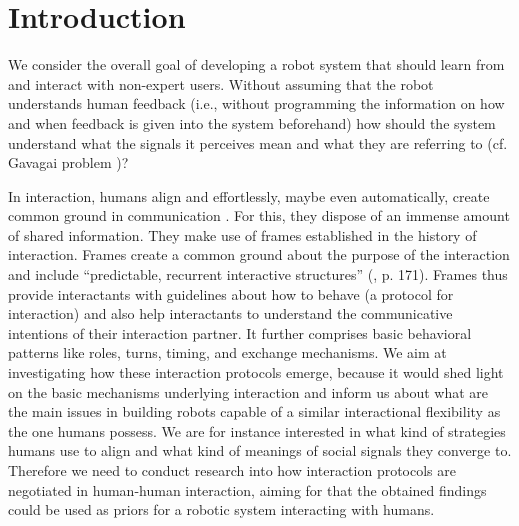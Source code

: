 \section{Introduction}


We consider the overall goal of developing a robot system that should learn from and interact with non-expert users. Without assuming that the robot understands human feedback (i.e., without programming the information on how and when feedback is given into the system beforehand) how should the system understand what the signals it perceives mean and what they are referring to (cf. Gavagai problem \cite{quine1964word})?

In interaction, humans align and effortlessly, maybe even automatically, create common ground in communication \cite{clark1991grounding,pickering2004toward}. For this, they dispose of an immense amount of shared information. They make use of frames established in the history of interaction. Frames create a common ground about the purpose of the interaction \cite{tomasello2009cultural,rohlfing2013learning} and include ``predictable, recurrent interactive structures'' (\cite{ninio1996pragmatic}, p. 171). Frames thus provide interactants with guidelines about how to behave (a protocol for interaction) and also help interactants to understand the communicative intentions of their interaction partner. It further comprises basic behavioral patterns like roles, turns, timing, and exchange mechanisms. We aim at investigating how these interaction protocols emerge, because it would shed light on the basic mechanisms underlying interaction and inform us about what are the main issues in building robots capable of a similar interactional flexibility as the one humans possess. We are for instance interested in what kind of strategies humans use to align and what kind of meanings of social signals they converge to. Therefore we need to conduct research into how interaction protocols are negotiated in human-human interaction, aiming for that the obtained findings could be used as priors for a robotic system interacting with humans.

